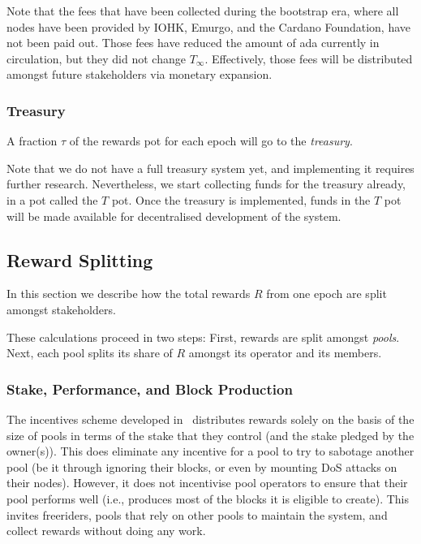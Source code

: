 \documentclass[11pt,a4paper,dvipsnames,twosided]{article}
\begin{document}
Note that the fees that have been collected during the bootstrap era,
where all nodes have been provided by IOHK, Emurgo, and the Cardano
Foundation, have not been paid out. Those fees have reduced the amount
of ada currently in circulation, but they did not change
\(T_\infty\). Effectively, those fees will be distributed amongst
future stakeholders via monetary expansion.

\subsubsection{Treasury}
\label{treasury}

A fraction \(\tau\) of the rewards pot for each epoch will go to the
\emph{treasury}.

Note that we do not have a full treasury system yet, and implementing it
requires further research. Nevertheless, we start collecting funds for the
treasury already, in a pot called the \(T\) pot. Once the treasury is
implemented, funds in the \(T\) pot will be made available for decentralised
development of the system.

\subsection{Reward Splitting}
\label{reward-splitting}

In this section we describe how the total rewards \(R\) from one epoch
are split amongst stakeholders.

These calculations proceed in two steps: First, rewards are split
amongst \emph{pools}. Next, each pool splits its share of \(R\) amongst
its operator and its members.

\subsubsection{Stake, Performance, and Block Production}
\label{stake-performance-and-block-production}

The incentives scheme developed in~\citep{bkks2018} distributes rewards solely
on the basis of the size of pools in terms of the stake that they control (and
the stake pledged by the owner(s)). This does eliminate any incentive for a pool
to try to sabotage another pool (be it through ignoring their blocks, or even by
mounting DoS attacks on their nodes). However, it does not incentivise pool
operators to ensure that their pool performs well (i.e., produces most of the
blocks it is eligible to create). This invites freeriders, pools that rely on
other pools to maintain the system, and collect rewards without doing any work.
\end{document}
